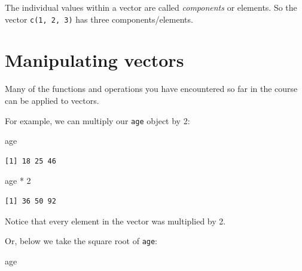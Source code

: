 \documentclass[
  letterpaper,
  DIV=11,
  numbers=noendperiod]{scrreprt}
\newenvironment{Shaded}{\begin{snugshade}}{\end{snugshade}}
\newcommand{\DecValTok}[1]{\textcolor[rgb]{0.68,0.00,0.00}{#1}}
\newcommand{\NormalTok}[1]{\textcolor[rgb]{0.00,0.23,0.31}{#1}}
\newcommand{\SpecialCharTok}[1]{\textcolor[rgb]{0.37,0.37,0.37}{#1}}
\begin{document}
\begin{tcolorbox}[enhanced jigsaw, colframe=quarto-callout-note-color-frame, rightrule=.15mm, opacityback=0, breakable, coltitle=black, colbacktitle=quarto-callout-note-color!10!white, bottomrule=.15mm, leftrule=.75mm, toprule=.15mm, arc=.35mm, bottomtitle=1mm, colback=white, left=2mm, opacitybacktitle=0.6, titlerule=0mm, title=\textcolor{quarto-callout-note-color}{\faInfo}\hspace{0.5em}{Vocab}, toptitle=1mm]

The individual values within a vector are called \emph{components} or
elements. So the vector \texttt{c(1,\ 2,\ 3)} has three
components/elements.

\end{tcolorbox}

\hypertarget{manipulating-vectors}{%
\section{Manipulating vectors}\label{manipulating-vectors}}

Many of the functions and operations you have encountered so far in the
course can be applied to vectors.

For example, we can multiply our \texttt{age} object by 2:

\begin{Shaded}
\begin{Highlighting}[]
\NormalTok{age}
\end{Highlighting}
\end{Shaded}

\begin{verbatim}
[1] 18 25 46
\end{verbatim}

\begin{Shaded}
\begin{Highlighting}[]
\NormalTok{age }\SpecialCharTok{*} \DecValTok{2}
\end{Highlighting}
\end{Shaded}

\begin{verbatim}
[1] 36 50 92
\end{verbatim}

Notice that every element in the vector was multiplied by 2.

Or, below we take the square root of \texttt{age}:

\begin{Shaded}
\begin{Highlighting}[]
\NormalTok{age}
\end{Highlighting}
\end{Shaded}
\end{document}
